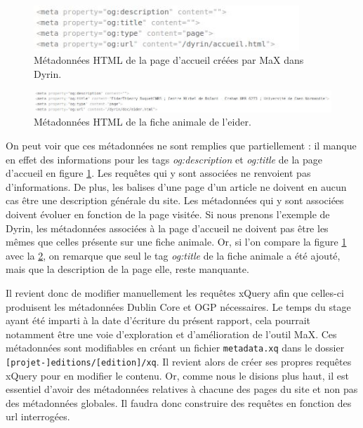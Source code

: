 \documentclass[a4paper,12pt,twoside]{book}
\begin{document}
\begin{figure}[H]
    \centering
    \includegraphics[width=10cm]{img/partie_2/og_test.JPG}
    \caption{Métadonnées \acrshort{HTML} de la page d'accueil créées par MaX dans Dyrin.}
    \label{meta_accueil}
\end{figure}


\begin{figure}[H]
    \centering
    \includegraphics[width=15cm]{img/partie_2/og_test_eider.JPG}
    \caption{Métadonnées \acrshort{HTML} de la fiche animale de l'eider.}
    \label{meta_eider}
\end{figure}


On peut voir que ces métadonnées ne sont remplies que partiellement : il manque en effet des informations pour les tags \textit{og:description} et \textit{og:title} de la page d'accueil en figure \ref{meta_accueil}. Les requêtes qui y sont associées ne renvoient pas d'informations. De plus, les balises d'une page d'un article ne doivent en aucun cas être une description générale du site. Les métadonnées qui y sont associées doivent évoluer en fonction de la page visitée. Si nous prenons l'exemple de Dyrin, les métadonnées associées à la page d'accueil ne doivent pas être les mêmes que celles présente sur une fiche animale. Or, si l'on compare la figure \ref{meta_accueil} avec la \ref{meta_eider}, on remarque que seul le tag \textit{og:title} de la fiche animale a été ajouté, mais que la description de la page elle, reste manquante.


Il revient donc de modifier manuellement les requêtes xQuery afin que celles-ci produisent les métadonnées Dublin Core et OGP nécessaires. Le temps du stage ayant été imparti à la date d'écriture du présent rapport, cela pourrait notamment être une voie d'exploration et d'amélioration de l'outil MaX. Ces métadonnées sont modifiables en créant un fichier \texttt{metadata.xq} dans le dossier \texttt{[projet-]editions/[edition]/xq}. Il revient alors de créer ses propres requêtes xQuery pour en modifier le contenu. Or, comme nous le disions plus haut, il est essentiel d'avoir des métadonnées relatives à chacune des pages du site et non pas des métadonnées globales. Il faudra donc construire des requêtes en fonction des url interrogées. 
\end{document}
